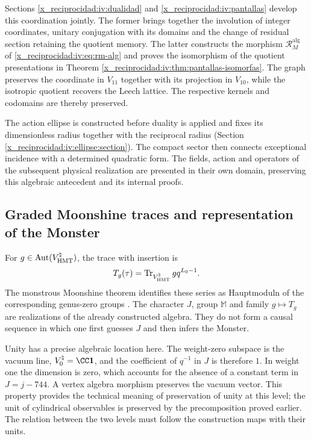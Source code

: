 Sections \ref{x_reciprocidad:iv:dualidad} and \ref{x_reciprocidad:iv:pantallas} develop
this coordination jointly. The former brings together the involution of
integer coordinates, unitary conjugation with its domains and the
change of residual section retaining the quotient memory. The latter
constructs the morphism \(\mathcal R_M^{\mathrm{alg}}\) of
\eqref{x_reciprocidad:iv:eq:rm-alg} and proves the isomorphism of the
quotient presentations in Theorem \ref{x_reciprocidad:iv:thm:pantallas-isomorfas}.
The graph preserves the coordinate in \(V_{11}\) together with its projection
in \(V_{10}\), while the isotropic quotient recovers the
Leech lattice. The respective kernels and codomains are thereby preserved.

The action ellipse is constructed before duality is applied and fixes
its dimensionless radius together with the reciprocal radius
(Section \ref{x_reciprocidad:iv:ellipse:section}). The compact sector then connects
exceptional incidence with a determined quadratic form. The
fields, action and operators of the subsequent physical realization
are presented in their own domain, preserving this algebraic
antecedent and its internal proofs.



\subsection{Graded Moonshine traces and representation of the Monster}
\label{x_reciprocidad:exc:alcance}

For $g\in\operatorname{Aut}(V^\natural_{\rm HMT})$, the trace
with insertion is
\[
 T_g(\tau)=
 \operatorname{Tr}_{V^\natural_{\rm HMT}}gq^{L_0-1}.
\]
The monstrous Moonshine theorem identifies these series as
Hauptmoduln of the corresponding genus-zero groups
\cite[teorema~1.1]{x_reciprocidad:borcherds}.
The character $J$, group $\mathbb M$ and family $g\mapsto T_g$
are realizations of the already constructed algebra. They do not form a causal
sequence in which one first guesses $J$ and then infers the Monster.

Unity has a precise algebraic location here. The weight-zero
subspace is the vacuum line, \(V^\natural_0=\CC\mathbf1\), and
the coefficient of \(q^{-1}\) in \(J\) is therefore \(1\). In weight one
the dimension is zero, which accounts for the absence of a constant term
in \(J=j-744\). A vertex algebra morphism preserves the vacuum
vector. This property provides the technical meaning of preservation
of unity at this level; the unit of cylindrical observables
is preserved by the precomposition proved earlier. The relation
between the two levels must follow the construction maps with their units.


